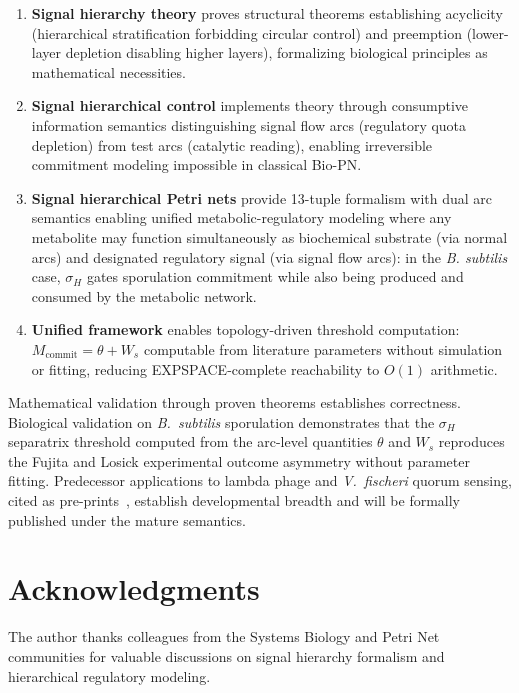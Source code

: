 \documentclass[10pt,letterpaper]{article}
\begin{document}
\begin{enumerate}
\item \textbf{Signal hierarchy theory} proves structural theorems establishing acyclicity (hierarchical stratification forbidding circular control) and preemption (lower-layer depletion disabling higher layers), formalizing biological principles as mathematical necessities.

\item \textbf{Signal hierarchical control} implements theory through consumptive information semantics distinguishing signal flow arcs (regulatory quota depletion) from test arcs (catalytic reading), enabling irreversible commitment modeling impossible in classical Bio-PN.

\item \textbf{Signal hierarchical Petri nets} provide 13-tuple formalism with dual arc semantics enabling unified metabolic-regulatory modeling where any metabolite may function simultaneously as biochemical substrate (via normal arcs) and designated regulatory signal (via signal flow arcs): in the \textit{B. subtilis} case, $\sigma_H$ gates sporulation commitment while also being produced and consumed by the metabolic network.

\item \textbf{Unified framework} enables topology-driven threshold computation: $M_{\text{commit}} = \theta + W_s$ computable from literature parameters without simulation or fitting, reducing EXPSPACE-complete reachability to $O(1)$ arithmetic.
\end{enumerate}

Mathematical validation through proven theorems establishes correctness. Biological validation on \textit{B.\ subtilis} sporulation demonstrates that the $\sigma_H$ separatrix threshold computed from the arc-level quantities $\theta$ and $W_s$ reproduces the Fujita and Losick experimental outcome asymmetry without parameter fitting. Predecessor applications to lambda phage and \textit{V.\ fischeri} quorum sensing, cited as pre-prints~\cite{simao2024hierarchical,simao2025unifying}, establish developmental breadth and will be formally published under the mature semantics.

\section*{Acknowledgments}

The author thanks colleagues from the Systems Biology and Petri Net communities for valuable discussions on signal hierarchy formalism and hierarchical regulatory modeling.
\end{document}

